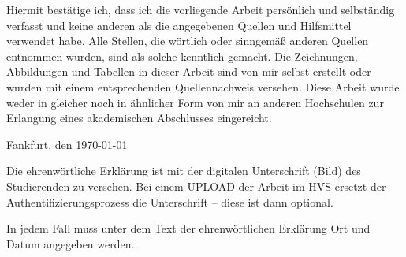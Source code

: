%
%


Hiermit bestätige ich, dass ich die vorliegende Arbeit persönlich und selbständig verfasst und keine anderen als die angegebenen Quellen und Hilfsmittel verwendet habe. Alle Stellen, die wörtlich oder sinngemäß anderen Quellen entnommen wurden, sind als solche kenntlich gemacht. Die Zeichnungen, Abbildungen und Tabellen in dieser Arbeit sind von mir selbst erstellt oder wurden mit einem entsprechenden Quellennachweis versehen. Diese Arbeit wurde weder in gleicher noch in ähnlicher Form von mir an anderen Hochschulen zur Erlangung eines akademischen Abschlusses eingereicht.

\vspace{2cm}
Fankfurt, den \today \dotfill

\hspace{10cm} {\footnotesize \fullname}

\vspace{2cm}

Die ehrenwörtliche Erklärung ist mit der digitalen Unterschrift (Bild) des Studierenden zu versehen. Bei einem UPLOAD der Arbeit im HVS ersetzt der Authentifizierungsprozess die Unterschrift – diese ist dann optional.

In jedem Fall muss unter dem Text der ehrenwörtlichen Erklärung Ort und Datum angegeben werden.
